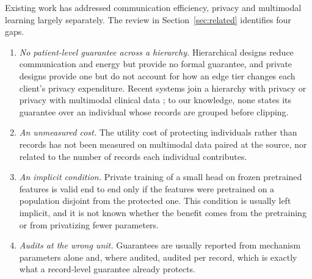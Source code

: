 Existing work has addressed communication efficiency, privacy and multimodal
learning largely separately. The review in Section~\ref{sec:related}
identifies four gaps.
\begin{enumerate}
\item \emph{No patient-level guarantee across a hierarchy.} Hierarchical
designs \cite{ref3, ref4, ref5} reduce communication and energy but provide no
formal guarantee, and private designs \cite{ref9, ref10} provide one but do
not account for how an edge tier changes each client's privacy expenditure.
Recent systems join a hierarchy with privacy \cite{ref34, ref37} or privacy
with multimodal clinical data \cite{ref35, ref36}; to our knowledge, none
states its guarantee over an individual whose records are grouped before
clipping.
\item \emph{An unmeasured cost.} The utility cost of protecting individuals
rather than records has not been measured on multimodal data paired at the
source, nor related to the number of records each individual contributes.
\item \emph{An implicit condition.} Private training of a small head on frozen
pretrained features \cite{ref12, ref13} is valid end to end only if the
features were pretrained on a population disjoint from the protected one.
This condition is usually left implicit, and it is not known whether the
benefit comes from the pretraining or from privatizing fewer parameters.
\item \emph{Audits at the wrong unit.} Guarantees are usually reported from
mechanism parameters alone and, where audited, audited per record, which is
exactly what a record-level guarantee already protects.
\end{enumerate}

